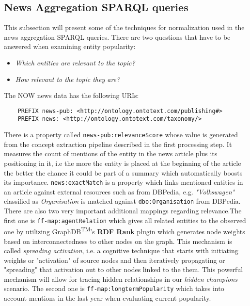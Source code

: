 \subsection{News Aggregation SPARQL queries}
This subsection will present some of the techniques for normalization used in the news aggregation SPARQL queries. There are two questions that have to be answered when examining entity popularity:
\begin{itemize}
    \item \textit{Which entities are relevant to the topic?}
    \item \textit{How relevant to the topic they are?}
\end{itemize}
The NOW news data has the following URIs:
\begin{verbatim}
    PREFIX news-pub: <http://ontology.ontotext.com/publishing#>
    PREFIX news: <http://ontology.ontotext.com/taxonomy/>
\end{verbatim}
There is a property called \texttt{news-pub:relevanceScore} whose value is generated from the concept extraction pipeline described in the first processing step. It measures the count of mentions of the entity in the news article plus its positioning in it, i.e the more the entity is placed at the beginning of the article the better the chance it could be part of a summary which automatically boosts its importance. \texttt{news:exactMatch} is a property which links mentioned entities in an article against external resources such as from DBPedia, e.g. \textit{"Volkswagen"} classified as \textit{Organisation} is matched against \texttt{dbo:Organisation} from DBPedia. There are also two very important additional mappings regarding relevance.The first one is \texttt{ff-map:agentRelation} which gives all related entities to the observed one by utilizing GraphDB\textsuperscript{TM}'s \textbf{RDF Rank} plugin which generates node weights based on interconnectedness to other nodes on the graph. This mechanism is called \textit{spreading activation}, i.e. a cognitive technique that starts with initiating weights or "activation" of source nodes and then iteratively propagating or "spreading" that activation out to other nodes linked to the them. This powerful mechanism will allow for tracing hidden relationships in our \textit{hidden champions} scenario. The second one is \texttt{ff-map:longtermPopularity} which takes into account mentions in the last year when evaluating current popularity.
    

